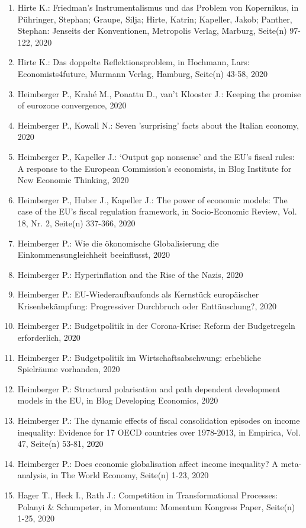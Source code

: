 \begin{enumerate}
	 \item Hirte K.: Friedman’s Instrumentalismus und das Problem von Kopernikus, in Pühringer, Stephan; Graupe, Silja; Hirte, Katrin; Kapeller, Jakob; Panther, Stephan: Jenseits der Konventionen, Metropolis Verlag, Marburg, Seite(n) 97-122, 2020
	 \item Hirte K.: Das doppelte Reflektionsproblem, in Hochmann, Lars: Economists4future, Murmann Verlag, Hamburg, Seite(n) 43-58, 2020
	 \item Heimberger P., Krahé M., Ponattu D., van't Klooster J.: Keeping the promise of eurozone convergence, 2020
	 \item Heimberger P., Kowall N.: Seven ’surprising’ facts about the Italian economy, 2020
	 \item Heimberger P., Kapeller J.: ‘Output gap nonsense’ and the EU’s fiscal rules: A response to the European Commission’s economists, in Blog Institute for New Economic Thinking, 2020
	 \item Heimberger P., Huber J., Kapeller J.: The power of economic models: The case of the EU's fiscal regulation framework, in Socio-Economic Review, Vol. 18, Nr. 2, Seite(n) 337-366, 2020
	 \item Heimberger P.: Wie die ökonomische Globalisierung die Einkommensungleichheit beeinflusst, 2020
	 \item Heimberger P.: Hyperinflation and the Rise of the Nazis, 2020
	 \item Heimberger P.: EU-Wiederaufbaufonds als Kernstück europäischer Krisenbekämpfung: Progressiver Durchbruch oder Enttäuschung?, 2020
	 \item Heimberger P.: Budgetpolitik in der Corona-Krise: Reform der Budgetregeln erforderlich, 2020
	 \item Heimberger P.: Budgetpolitik im Wirtschaftsabschwung: erhebliche Spielräume vorhanden, 2020
	 \item Heimberger P.: Structural polarisation and path dependent development models in the EU, in Blog Developing Economics, 2020
	 \item Heimberger P.: The dynamic effects of fiscal consolidation episodes on income inequality: Evidence for 17 OECD countries over 1978-2013, in Empirica, Vol. 47, Seite(n) 53-81, 2020
	 \item Heimberger P.: Does economic globalisation affect income inequality? A meta-analysis, in The World Economy, Seite(n) 1-23, 2020
	 \item Hager T., Heck I., Rath J.: Competition in Transformational Processes: Polanyi & Schumpeter, in Momentum: Momentum Kongress Paper, Seite(n) 1-25, 2020

\end{enumerate}
